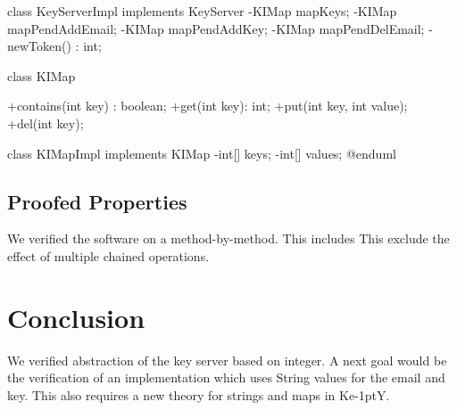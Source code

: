 \documentclass{llncs}
\newcommand{\KeY}{Ke\kern-1ptY\xspace}
\begin{document}
class KeyServerImpl implements KeyServer {
    -KIMap mapKeys;
    -KIMap mapPendAddEmail;
    -KIMap mapPendAddKey;
    -KIMap mapPendDelEmail;
    -newToken() : int;
}

class KIMap {
    +contains(int key) : boolean;
    +get(int key): int;
    +put(int key, int value);
    +del(int key);

}

class KIMapImpl implements KIMap {
    -int[] keys;
    -int[] values;
}
@enduml
\fi

\subsection*{Proofed Properties}

We verified the software on a method-by-method.
%
This includes
%
This exclude the effect of multiple chained operations.

\section{Conclusion }

We verified abstraction of the key server based on integer.
%
A next goal would be the verification of an implementation which uses String
values for the email and key. This also requires a new theory for strings and
maps in \KeY.
%
%
\end{document}
